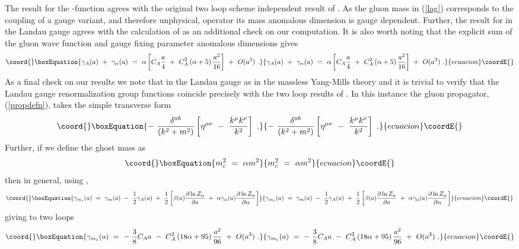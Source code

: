\documentclass[a4paper,11pt]{article}
\providecommand{\half}{\mbox{\small{\myHighlight{$\frac{1}{2}$}\coordHE{}}}}
\begin{document}
The result for the \myHighlight{$\beta$}\coordHE{}-function agrees with the original two loop scheme
independent result of \cite{25,26}. As the gluon mass in (\ref{lag}) 
corresponds to the coupling of a gauge variant, and therefore unphysical, 
operator its mass anomalous dimension is gauge dependent. Further, the result 
for \coordHE{} in the Landau gauge agrees with the calculation of \cite{7}
as an additional check on our computation. It is also worth noting that the 
explicit sum of the gluon wave function and gauge fixing parameter anomalous
dimensions gives  
\begin{equation}\coord{}\boxEquation{ 
\gamma_A(a) ~+~ \gamma_\alpha(a) ~=~ \alpha \left[ C_A \frac{a}{4} ~+~ C_A^2 
\left( \alpha + 5 \right) \frac{a^2}{16} \right] ~+~ O(a^3) ~.  
}{ 
\gamma_A(a) ~+~ \gamma_\alpha(a) ~=~ \alpha \left[ C_A \frac{a}{4} ~+~ C_A^2 
\left( \alpha + 5 \right) \frac{a^2}{16} \right] ~+~ O(a^3) ~.  
}{ecuacion}\coordE{}\end{equation} 
As a final check on our results we note that in the Landau gauge 
\coordHE{}  \myHighlight{$=$}\coordHE{}  \myHighlight{$-$}\coordHE{}  \coordHE{} as in the massless Yang-Mills theory
and it is trivial to verify that the Landau gauge renormalization group 
functions coincide precisely with the two loop results of \cite{25,26,27,22}. 
In this instance the gluon propagator, 
(\ref{propdefn}), takes the simple transverse form  
\begin{equation}\coord{}\boxEquation{ 
-~ \frac{\delta^{ab}}{(k^2+m^2)} \left[ \eta^{\mu\nu} ~-~ \frac{k^\mu k^\nu}
{k^2} \right] ~.  
}{ 
-~ \frac{\delta^{ab}}{(k^2+m^2)} \left[ \eta^{\mu\nu} ~-~ \frac{k^\mu k^\nu}
{k^2} \right] ~.  
}{ecuacion}\coordE{}\end{equation} 
Further, if we define the ghost mass as   
\begin{equation}\coord{}\boxEquation{ 
m^2_c ~=~ \alpha m^2 
}{ 
m^2_c ~=~ \alpha m^2 
}{ecuacion}\coordE{}\end{equation} 
then in general, using \coordHE{}  \myHighlight{$=$}\coordHE{}  \myHighlight{$Z_m Z^{\half}_A Z_\alpha^{-\half}$}\coordHE{},  
\begin{equation}\coord{}\boxEquation{ 
\gamma_{m_c}(a) ~=~ \gamma_m(a) ~-~ \frac{1}{2} \gamma_A(a) ~+~ 
\frac{1}{2} \left[ \beta(a) \frac{\partial \ln Z_\alpha}{\partial a} ~+~
\alpha \gamma_\alpha(a) \frac{\partial \ln Z_\alpha}{\partial \alpha} \right] 
}{ 
\gamma_{m_c}(a) ~=~ \gamma_m(a) ~-~ \frac{1}{2} \gamma_A(a) ~+~ 
\frac{1}{2} \left[ \beta(a) \frac{\partial \ln Z_\alpha}{\partial a} ~+~
\alpha \gamma_\alpha(a) \frac{\partial \ln Z_\alpha}{\partial \alpha} \right] 
}{ecuacion}\coordE{}\end{equation}  
giving to two loops 
\begin{equation}\coord{}\boxEquation{ 
\gamma_{m_c}(a) ~=~ -~ \frac{3}{8} C_A a ~-~ C_A^2 \left( 18 \alpha + 95 
\right) \frac{a^2}{96} ~+~ O(a^3) ~.  
}{ 
\gamma_{m_c}(a) ~=~ -~ \frac{3}{8} C_A a ~-~ C_A^2 \left( 18 \alpha + 95 
\right) \frac{a^2}{96} ~+~ O(a^3) ~.  
}{ecuacion}\coordE{}\end{equation} 
\end{document}
